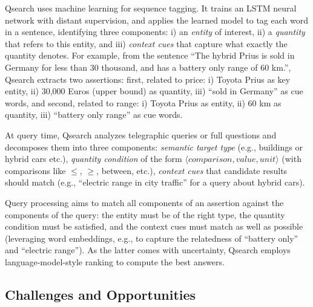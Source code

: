 \documentclass[11pt]{article}
\begin{document}
\vspace{0.2cm}
Qsearch 
uses
machine learning for sequence tagging. 
It trains an LSTM neural network with distant supervision,
and applies the learned model to tag each word in a sentence,
identifying three components:
i) an {\em entity} of interest, ii) a {\em quantity} that refers to this entity,
and iii) {\em context cues} that capture what exactly the quantity denotes.
For example, from the sentence
``The hybrid Prius is sold in Germany for less than 30 thousand, and
has a battery only range of 60 km.'',
Qsearch extracts two assertions:
first, related to price: i) Toyota Prius as key entity, 
ii) 30,000 Euros (upper bound) as quantity,
iii) ``sold in Germany'' as cue words,
and second, related to range: i) Toyota Prius as entity,
ii) 60 km as quantity, 
iii) ``battery only range'' as cue words.

\vspace{0.2cm}
At query time, Qsearch analyzes telegraphic queries or full questions and 
decomposes them into three components:
{\em semantic target type} (e.g., buildings or hybrid cars etc.),
{\em quantity condition} of the form $\langle comparison, value, unit \rangle$
(with comparisons like $\le$, $\ge$, {between}, etc.),
{\em context cues} that candidate results should match (e.g., ``electric range in city traffic''
for a query about hybrid cars).

\vspace{0.2cm}
Query processing aims to match all components of an assertion against the
components of the query: the entity must be of the right type,
the quantity condition must be satisfied, and the context cues must match
as well as possible (leveraging word embeddings, e.g., to capture the
relatedness of ``battery only'' and ``electric range'').
As the latter comes with uncertainty, Qsearch employs 
language-model-style ranking to compute the best answers.




\subsection*{Challenges and Opportunities}
\end{document}
